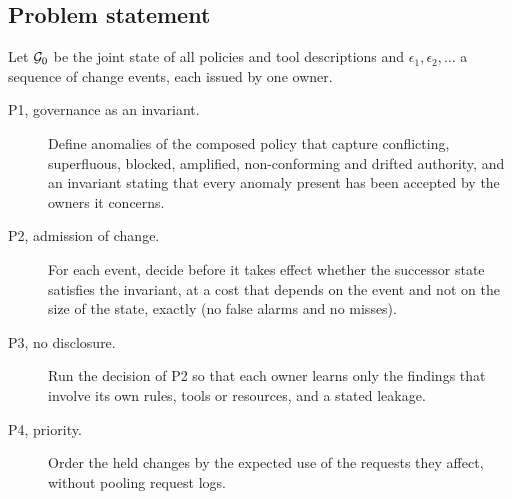 \subsection{Problem statement}\label{sec:problem}
Let $\mathcal{G}_0$ be the joint state of all policies and tool descriptions and $\epsilon_1, \epsilon_2, \dots$ a sequence of change events, each issued by one owner.
\begin{description}
\item[P1, governance as an invariant.] Define anomalies of the composed policy that capture conflicting, superfluous, blocked, amplified, non-conforming and drifted authority, and an invariant stating that every anomaly present has been accepted by the owners it concerns.
\item[P2, admission of change.] For each event, decide before it takes effect whether the successor state satisfies the invariant, at a cost that depends on the event and not on the size of the state, exactly (no false alarms and no misses).
\item[P3, no disclosure.] Run the decision of P2 so that each owner learns only the findings that involve its own rules, tools or resources, and a stated leakage.
\item[P4, priority.] Order the held changes by the expected use of the requests they affect, without pooling request logs.
\end{description}
